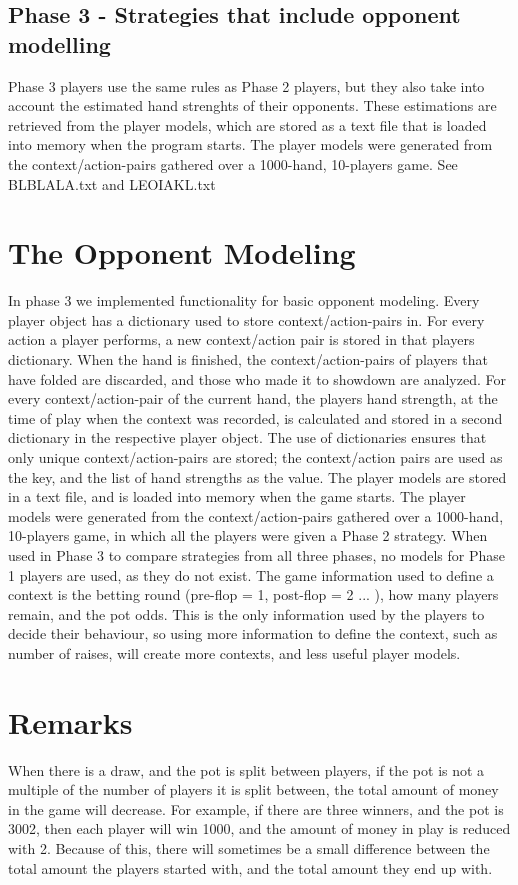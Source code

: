 \documentclass[titlepage]{article}
\begin{document}
	\subsection{Phase 3 - Strategies that include opponent modelling}
		Phase 3 players use the same rules as Phase 2 players, but they also take into account the estimated hand strenghts of their opponents. These estimations are retrieved from the player models, which are stored as a text file that is loaded into memory when the program starts. The player models were generated from the context/action-pairs gathered over a 1000-hand, 10-players game. See BLBLALA.txt and LEOIAKL.txt
		
\section{The Opponent Modeling}
    In phase 3 we implemented functionality for basic opponent modeling. Every player object has a dictionary used to store context/action-pairs in. For every action a player performs, a new context/action pair is stored in that players dictionary. When the hand is finished, the context/action-pairs of players that have folded are discarded, and those who made it to showdown are analyzed. For every context/action-pair of the current hand, the players hand strength, at the time of play when the context was recorded, is calculated and stored in a second dictionary in the respective player object. The use of dictionaries ensures that only unique context/action-pairs are stored; the context/action pairs are used as the key, and the list of hand strengths as the value. The player models are stored in a text file, and is loaded into memory when the game starts. The player models were generated from the context/action-pairs gathered over a 1000-hand, 10-players game, in which all the players were given a Phase 2 strategy. When used in Phase 3 to compare strategies from all three phases, no models for Phase 1 players are used, as they do not exist. The game information used to define a context is the betting round (pre-flop = 1, post-flop = 2 ... ), how many players remain, and the pot odds. This is the only information used by the players to decide their behaviour, so using more information to define the context, such as number of raises, will create more contexts, and less useful player models. 
		
\section{Remarks}
    When there is a draw, and the pot is split between players, if the pot is not a multiple of the number of players it is split between, the total amount of money in the game will decrease. For example, if there are three winners, and the pot is 3002, then each player will win 1000, and the amount of money in play is reduced with 2. Because of this, there will sometimes be a small difference between the total amount the players started with, and the total amount they end up with.
    		
\end{document}
